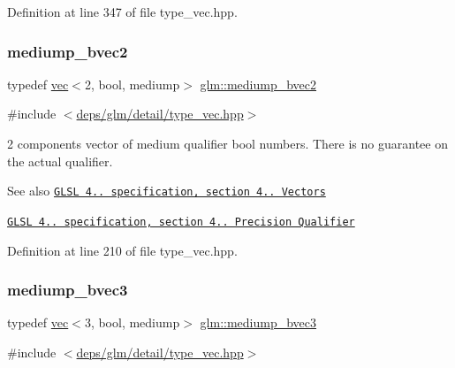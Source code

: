 Definition at line 347 of file type\+\_\+vec.\+hpp.

\mbox{\label{group__core__precision_ga84008d451452ffe0f6c8f395fd61a8df}} 
\subsubsection{\texorpdfstring{mediump\+\_\+bvec2}{mediump\_bvec2}}
{\footnotesize\ttfamily typedef \hyperlink{structglm_1_1vec}{vec}$<$2, bool, mediump$>$ \hyperlink{group__core__precision_ga84008d451452ffe0f6c8f395fd61a8df}{glm\+::mediump\+\_\+bvec2}}



{\ttfamily \#include $<$\hyperlink{type__vec_8hpp}{deps/glm/detail/type\+\_\+vec.\+hpp}$>$}

2 components vector of medium qualifier bool numbers. There is no guarantee on the actual qualifier.

\begin{DoxySeeAlso}{See also}
\href{http://www.opengl.org/registry/doc/GLSLangSpec.4.20.8.pdf}{\tt G\+L\+SL 4.. specification, section 4.. Vectors} 

\href{http://www.opengl.org/registry/doc/GLSLangSpec.4.20.8.pdf}{\tt G\+L\+SL 4.. specification, section 4.. Precision Qualifier} 
\end{DoxySeeAlso}


Definition at line 210 of file type\+\_\+vec.\+hpp.

\mbox{\label{group__core__precision_ga40b0d98c1fef52b1f6f6736c7223e317}} 
\subsubsection{\texorpdfstring{mediump\+\_\+bvec3}{mediump\_bvec3}}
{\footnotesize\ttfamily typedef \hyperlink{structglm_1_1vec}{vec}$<$3, bool, mediump$>$ \hyperlink{group__core__precision_ga40b0d98c1fef52b1f6f6736c7223e317}{glm\+::mediump\+\_\+bvec3}}



{\ttfamily \#include $<$\hyperlink{type__vec_8hpp}{deps/glm/detail/type\+\_\+vec.\+hpp}$>$}

